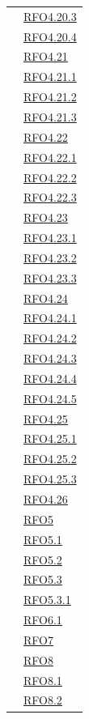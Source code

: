 \begin{itemize}
\begin{itemize}
\begin{itemize}
\begin{itemize}
\begin{longtable}{|>{\centering}m{5cm}|m{5cm}<{\centering}|}
& \hyperlink{RFO4.20.3}{RFO4.20.3}\\
& \hyperlink{RFO4.20.4}{RFO4.20.4}\\
& \hyperlink{RFO4.21}{RFO4.21}\\
& \hyperlink{RFO4.21.1}{RFO4.21.1}\\
& \hyperlink{RFO4.21.2}{RFO4.21.2}\\
& \hyperlink{RFO4.21.3}{RFO4.21.3}\\
& \hyperlink{RFO4.22}{RFO4.22}\\
& \hyperlink{RFO4.22.1}{RFO4.22.1}\\
& \hyperlink{RFO4.22.2}{RFO4.22.2}\\
& \hyperlink{RFO4.22.3}{RFO4.22.3}\\
& \hyperlink{RFO4.23}{RFO4.23}\\
& \hyperlink{RFO4.23.1}{RFO4.23.1}\\
& \hyperlink{RFO4.23.2}{RFO4.23.2}\\
& \hyperlink{RFO4.23.3}{RFO4.23.3}\\
& \hyperlink{RFO4.24}{RFO4.24}\\
& \hyperlink{RFO4.24.1}{RFO4.24.1}\\
& \hyperlink{RFO4.24.2}{RFO4.24.2}\\
& \hyperlink{RFO4.24.3}{RFO4.24.3}\\
& \hyperlink{RFO4.24.4}{RFO4.24.4}\\
& \hyperlink{RFO4.24.5}{RFO4.24.5}\\
& \hyperlink{RFO4.25}{RFO4.25}\\
& \hyperlink{RFO4.25.1}{RFO4.25.1}\\
& \hyperlink{RFO4.25.2}{RFO4.25.2}\\
& \hyperlink{RFO4.25.3}{RFO4.25.3}\\
& \hyperlink{RFO4.26}{RFO4.26}\\
& \hyperlink{RFO5}{RFO5}\\
& \hyperlink{RFO5.1}{RFO5.1}\\
& \hyperlink{RFO5.2}{RFO5.2}\\
& \hyperlink{RFO5.3}{RFO5.3}\\
& \hyperlink{RFO5.3.1}{RFO5.3.1}\\
& \hyperlink{RFO6.1}{RFO6.1}\\
& \hyperlink{RFO7}{RFO7}\\
& \hyperlink{RFO8}{RFO8}\\
& \hyperlink{RFO8.1}{RFO8.1}\\
& \hyperlink{RFO8.2}{RFO8.2}\\

\end{longtable}
\end{itemize}
\end{itemize}
\end{itemize}
\end{itemize}
